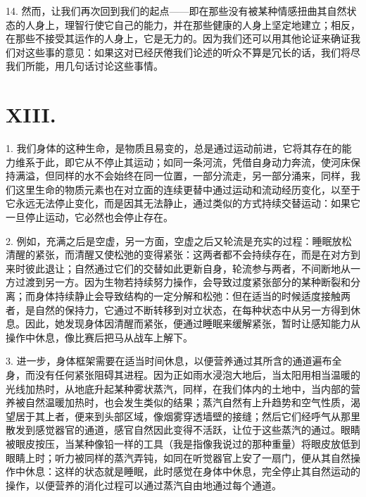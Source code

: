 14. 然而，让我们再次回到我们的起点——即在那些没有被某种情感扭曲其自然状态的人身上，理智行使它自己的能力，并在那些健康的人身上坚定地建立；相反，在那些不接受其运作的人身上，它是无力的。因为我们还可以用其他论证来确证我们对这些事的意见：如果这对已经厌倦我们论述的听众不算是冗长的话，我们将尽我们所能，用几句话讨论这些事情。\par


\section{XIII. }

1. 我们身体的这种生命，是物质且易变的，总是通过运动前进，它将其存在的能力维系于此，即它从不停止其运动；如同一条河流，凭借自身动力奔流，使河床保持满溢，但同样的水不会始终在同一位置，一部分流走，另一部分涌来，同样，我们这里生命的物质元素也在对立面的连续更替中通过运动和流动经历变化，以至于它永远无法停止变化，而是因其无法静止，通过类似的方式持续交替运动：如果它一旦停止运动，它必然也会停止存在。\par

2. 例如，充满之后是空虚，另一方面，空虚之后又轮流是充实的过程：睡眠放松清醒的紧张，而清醒又使松弛的变得紧张：这两者都不会持续存在，而是在对方到来时彼此退让；自然通过它们的交替如此更新自身，轮流参与两者，不间断地从一方过渡到另一方。因为生物若持续努力操作，会导致过度紧张部分的某种断裂和分离；而身体持续静止会导致结构的一定分解和松弛：但在适当的时候适度接触两者，是自然的保持力，它通过不断转移到对立状态，在每种状态中从另一方得到休息。因此，她发现身体因清醒而紧张，便通过睡眠来缓解紧张，暂时让感知能力从操作中休息，像比赛后把马从战车上解下。\par

3. 进一步，身体框架需要在适当时间休息，以便营养通过其所含的通道遍布全身，而没有任何紧张阻碍其进程。因为正如雨水浸泡大地后，当太阳用相当温暖的光线加热时，从地底升起某种雾状蒸汽，同样，在我们体内的土地中，当内部的营养被自然温暖加热时，也会发生类似的结果；蒸汽自然有上升趋势和空气性质，渴望居于其上者，便来到头部区域，像烟雾穿透墙壁的接缝；然后它们经呼气从那里散发到感觉器官的通道，感官自然因此变得不活跃，让位于这些蒸汽的通过。眼睛被眼皮按压，当某种像铅一样的工具（我是指像我说过的那种重量）将眼皮放低到眼睛上时；听力被同样的蒸汽弄钝，如同在听觉器官上安了一扇门，便从其自然操作中休息：这样的状态就是睡眠，此时感觉在身体中休息，完全停止其自然运动的操作，以便营养的消化过程可以通过蒸汽自由地通过每个通道。\par


